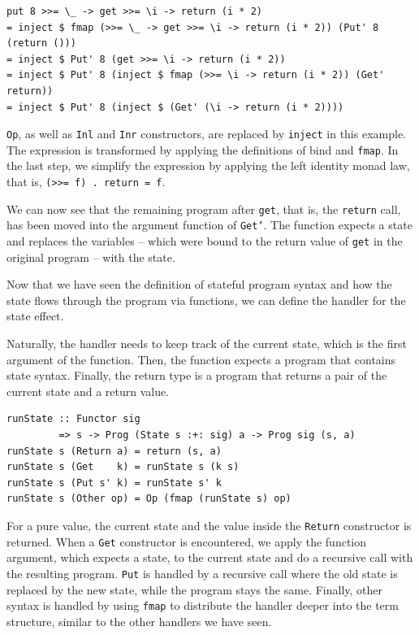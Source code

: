 \documentclass[a4paper, 11pt, fleqn, twoside, abstract=on]{scrreprt}
\newcommand{\hinl}[1]{\texttt{#1}}
\begin{document}
\begin{verbatim}
put 8 >>= \_ -> get >>= \i -> return (i * 2)
= inject $ fmap (>>= \_ -> get >>= \i -> return (i * 2)) (Put' 8 (return ()))
= inject $ Put' 8 (get >>= \i -> return (i * 2))
= inject $ Put' 8 (inject $ fmap (>>= \i -> return (i * 2)) (Get' return))
= inject $ Put' 8 (inject $ (Get' (\i -> return (i * 2))))
\end{verbatim}
\noindent
\hinl{Op}, as well as \hinl{Inl} and \hinl{Inr} constructors, are replaced by \hinl{inject} in this example.
The expression is transformed by applying the definitions of bind and \hinl{fmap}.
In the last step, we simplify the expression by applying the left identity monad law, that is, \hinl{(>>= f) . return = f}.

We can now see that the remaining program after \hinl{get}, that is, the \hinl{return} call, has been moved into the argument function of \hinl{Get'}.
The function expects a state and replaces the variables -- which were bound to the return value of \hinl{get} in the original program -- with the state.

Now that we have seen the definition of stateful program syntax and how the state flows through the program via functions, we can define the handler for the state effect.

Naturally, the handler needs to keep track of the current state, which is the first argument of the function.
Then, the function expects a program that contains state syntax.
Finally, the return type is a program that returns a pair of the current state and a return value.

\begin{verbatim}
runState :: Functor sig 
         => s -> Prog (State s :+: sig) a -> Prog sig (s, a)
runState s (Return a) = return (s, a)
runState s (Get    k) = runState s (k s)
runState s (Put s' k) = runState s' k
runState s (Other op) = Op (fmap (runState s) op)
\end{verbatim}
\noindent
For a pure value, the current state and the value inside the \hinl{Return} constructor is returned.
When a \hinl{Get} constructor is encountered, we apply the function argument, which expects a state, to the current state and do a recursive call with the resulting program.
\hinl{Put} is handled by a recursive call where the old state is replaced by the new state, while the program stays the same.
Finally, other syntax is handled by using \hinl{fmap} to distribute the handler deeper into the term structure, similar to the other handlers we have seen.
\end{document}
